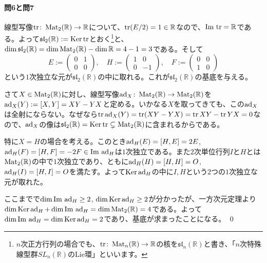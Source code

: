 \paragraph{問6と問7}

線型写像$\operatorname{tr}\colon \operatorname{Mat}_2(\mathbb{R}) \rightarrow \mathbb{R}$について、$\operatorname{tr} (E/2) = 1 \in \mathbb{R}$なので、$\mathrm{Im}\, \operatorname{tr} = \mathbb{R}$である。よって$\mathfrak{sl}_2(\mathbb{R}) := \operatorname{Ker} \operatorname{tr}$とおく\footnote{$n$次正方行列の場合でも、$\operatorname{tr}\colon\operatorname{Mat}_n(\mathbb{R})\rightarrow \mathbb{R}$の核を$\mathfrak{sl}_n(\mathbb{R})$と書き、「$n$次特殊線型群$SL_n(\mathbb{R})$のLie環」といいます。}と、$\dim \mathfrak{sl}_2(\mathbb{R}) = \dim \operatorname{Mat}_2(\mathbb{R}) - \dim \mathbb{R} = 4 - 1 = 3$である。そして
\[
E :=
\begin{pmatrix}
0 & 1 \\
0 & 0
\end{pmatrix}, \quad
H :=
\begin{pmatrix}
1 & 0 \\
0 & -1
\end{pmatrix}, \quad
F :=
\begin{pmatrix}
0 & 0 \\
1 & 0
\end{pmatrix}
\]
という$1$次独立な元が$\mathfrak{sl}_2(\mathbb{R})$の中に取れる。これが$\mathfrak{sl}_2(\mathbb{R})$の基底を与える。

さて$X \in \operatorname{Mat}_2(\mathbb{R})$に対し、線型写像$\operatorname{ad}_X\colon\operatorname{Mat}_2(\mathbb{R})\rightarrow\operatorname{Mat}_2(\mathbb{R})$を$\operatorname{ad}_X(Y) := [X, Y] = XY - YX$と定める。いかなる$X$を取ってきても、この$\operatorname{ad}_X$は全射にならない。なぜなら$\operatorname{tr} \operatorname{ad}_X(Y) = \operatorname{tr}(XY - YX) = \operatorname{tr} XY - \operatorname{tr} YX = 0$なので、$\operatorname{ad}_X$の像は$\mathfrak{sl}_2(\mathbb{R}) = \operatorname{Ker} \operatorname{tr}\subsetneq\operatorname{Mat}_2(\mathbb{R})$に含まれるからである。

特に$X = H$の場合を考える。このとき$\operatorname{ad}_H(E) = [H, E] = 2E$, $\operatorname{ad}_H(F) = [H, F] = -2F \in \mathrm{Im}\, \operatorname{ad}_H$は$1$次独立である。また$2$次単位行列$I$と$H$とは$\operatorname{Mat}_2(\mathbb{R})$の中で$1$次独立であり、ともに$\operatorname{ad}_H(H) = [H, H] = O$, $\operatorname{ad}_H(I) = [H, I] = O$を満たす。よって$\operatorname{Ker} \operatorname{ad}_H$の中に$I, H$という$2$つの$1$次独立な元が取れた。

ここまでで$\dim \mathrm{Im}\, \operatorname{ad}_H \geq 2$, $\dim \operatorname{Ker} \operatorname{ad}_H \geq 2$が分かったが、一方次元定理より$\dim \operatorname{Ker} \operatorname{ad}_H + \dim \mathrm{Im}\, \operatorname{ad}_H = \dim \operatorname{Mat}_2(\mathbb{R}) = 4$である。よって$\dim \mathrm{Im}\, \operatorname{ad}_H = \dim \operatorname{Ker} \operatorname{ad}_H = 2$であり、基底が求まったことになる。 \qed


